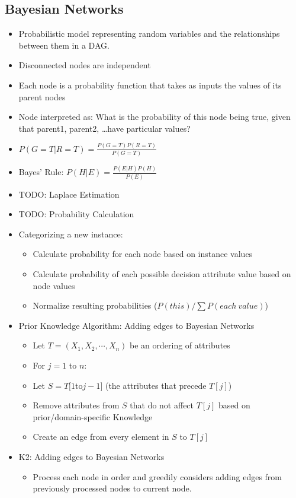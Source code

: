 \documentclass{article}
\begin{document}
\subsection{Bayesian Networks}
\begin{itemize}
	\item Probabilistic model representing random variables and the relationships between them in a DAG.
	\item Disconnected nodes are independent
	\item Each node is a probability function that takes as inputs the values of its parent nodes
	\item Node interpreted as: What is the probability of this node being true, given that parent1, parent2, \ldots have particular values?
	\item $P(G = T | R = T) = \frac{P(G = T) P(R = T)}{P(G = T)}$
	\item Bayes' Rule: $P(H | E) = \frac{P(E | H) P(H)}{P(E)}$
	\item TODO: Laplace Estimation
	\item TODO: Probability Calculation
	\item Categorizing a new instance:
		\begin{itemize}
			\item Calculate probability for each node based on instance values
			\item Calculate probability of each possible decision attribute value based on node values
			\item Normalize resulting probabilities ($P(this) / \sum P(each\ value)$)
		\end{itemize}
	\item Prior Knowledge Algorithm: Adding edges to Bayesian Networks
		\begin{itemize}
			\item Let $T = (X_1, X_2, \cdots, X_n)$ be an ordering of attributes
			\item For $j = 1$ to $n$:
			\item Let $S = T[1 $to$ j - 1]$ (the attributes that precede $T[j]$)
			\item Remove attributes from $S$ that do not affect $T[j]$ based on prior/domain-specific Knowledge
			\item Create an edge from every element in $S$ to $T[j]$
		\end{itemize}
	\item K2: Adding edges to Bayesian Networks
		\begin{itemize}
			\item Process each node in order and greedily considers adding edges from previously processed nodes to current node.

\end{itemize}
\end{itemize}
\end{document}
